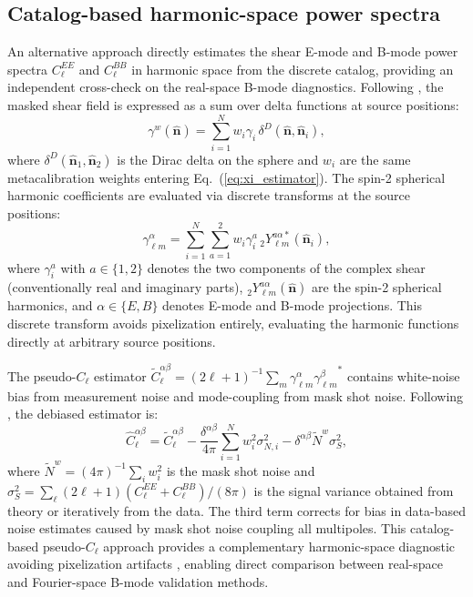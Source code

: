\documentclass{aa}
\begin{document}
\subsection{Catalog-based harmonic-space power spectra}
\label{sec:catalog_cls}

An alternative approach directly estimates the shear E-mode and B-mode power spectra $C_\ell^{EE}$ and $C_\ell^{BB}$ in harmonic space from the discrete catalog, providing an independent cross-check on the real-space B-mode diagnostics. Following \citet{wolz.etal25}, the masked shear field is expressed as a sum over delta functions at source positions:
\begin{equation}
\gamma^w(\hat{\mathbf{n}}) = \sum_{i=1}^N w_i \gamma_i \, \delta^D(\hat{\mathbf{n}}, \hat{\mathbf{n}}_i),
\label{eq:catalog_masked_field}
\end{equation}
where $\delta^D(\hat{\mathbf{n}}_1, \hat{\mathbf{n}}_2)$ is the Dirac delta on the sphere and $w_i$ are the same metacalibration weights entering Eq.~(\ref{eq:xi_estimator}). The spin-2 spherical harmonic coefficients are evaluated via discrete transforms at the source positions:
\begin{equation}
\gamma_{\ell m}^{\alpha} = \sum_{i=1}^N \sum_{a=1}^2 w_i \gamma_i^a \, {}_{2}Y_{\ell m}^{a\alpha*}(\hat{\mathbf{n}}_i),
\label{eq:discrete_sht}
\end{equation}
where $\gamma_i^a$ with $a \in \{1,2\}$ denotes the two components of the complex shear (conventionally real and imaginary parts), ${}_{2}Y_{\ell m}^{a\alpha}(\hat{\mathbf{n}})$ are the spin-2 spherical harmonics, and $\alpha \in \{E,B\}$ denotes E-mode and B-mode projections. This discrete transform avoids pixelization entirely, evaluating the harmonic functions directly at arbitrary source positions.

The pseudo-$C_\ell$ estimator $\tilde{C}_\ell^{\alpha\beta} = (2\ell+1)^{-1} \sum_m \gamma_{\ell m}^\alpha {\gamma_{\ell m}^\beta}^*$ contains white-noise bias from measurement noise and mode-coupling from mask shot noise. Following \citet{wolz.etal25}, the debiased estimator is:
\begin{equation}
\hat{C}_\ell^{\alpha\beta} = \tilde{C}_\ell^{\alpha\beta} - \frac{\delta^{\alpha\beta}}{4\pi} \sum_{i=1}^N w_i^2 \sigma_{N,i}^2 - \delta^{\alpha\beta} \tilde{N}^w \sigma_S^2,
\label{eq:pcl_debiased}
\end{equation}
where $\tilde{N}^w = (4\pi)^{-1} \sum_i w_i^2$ is the mask shot noise and $\sigma_S^2 = \sum_\ell (2\ell+1)(C_\ell^{EE} + C_\ell^{BB})/(8\pi)$ is the signal variance obtained from theory or iteratively from the data. The third term corrects for bias in data-based noise estimates caused by mask shot noise coupling all multipoles. This catalog-based pseudo-$C_\ell$ approach provides a complementary harmonic-space diagnostic avoiding pixelization artifacts \citep{wolz.etal25}, enabling direct comparison between real-space and Fourier-space B-mode validation methods.
\end{document}
